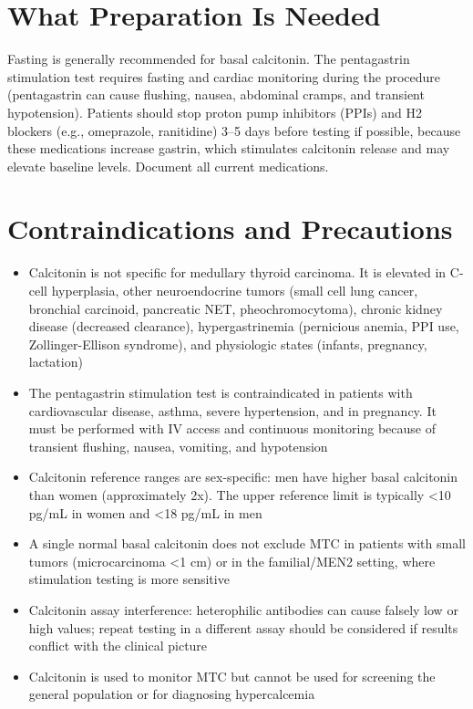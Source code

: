 \section*{What Preparation Is Needed}
Fasting is generally recommended for basal calcitonin. The pentagastrin stimulation test requires fasting and cardiac monitoring during the procedure (pentagastrin can cause flushing, nausea, abdominal cramps, and transient hypotension). Patients should stop proton pump inhibitors (PPIs) and H2 blockers (e.g., omeprazole, ranitidine) 3--5 days before testing if possible, because these medications increase gastrin, which stimulates calcitonin release and may elevate baseline levels. Document all current medications.

\section*{Contraindications and Precautions}
\begin{itemize}
  \item Calcitonin is not specific for medullary thyroid carcinoma. It is elevated in C-cell hyperplasia, other neuroendocrine tumors (small cell lung cancer, bronchial carcinoid, pancreatic NET, pheochromocytoma), chronic kidney disease (decreased clearance), hypergastrinemia (pernicious anemia, PPI use, Zollinger-Ellison syndrome), and physiologic states (infants, pregnancy, lactation)
  \item The pentagastrin stimulation test is contraindicated in patients with cardiovascular disease, asthma, severe hypertension, and in pregnancy. It must be performed with IV access and continuous monitoring because of transient flushing, nausea, vomiting, and hypotension
  \item Calcitonin reference ranges are sex-specific: men have higher basal calcitonin than women (approximately 2x). The upper reference limit is typically <10 pg/mL in women and <18 pg/mL in men
  \item A single normal basal calcitonin does not exclude MTC in patients with small tumors (microcarcinoma <1 cm) or in the familial/MEN2 setting, where stimulation testing is more sensitive
  \item Calcitonin assay interference: heterophilic antibodies can cause falsely low or high values; repeat testing in a different assay should be considered if results conflict with the clinical picture
  \item Calcitonin is used to monitor MTC but cannot be used for screening the general population or for diagnosing hypercalcemia
\end{itemize}
